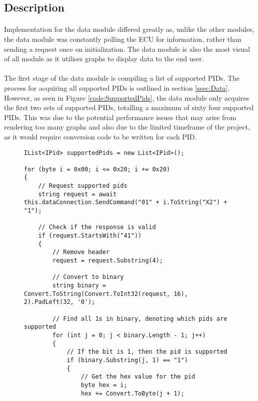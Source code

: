 	\subsection{Description}{		
		\paragraph{}{
		Implementation for the data module differed greatly as, unlike the other modules, the data module was constantly polling the ECU for information, rather than sending a request once on initialization. The data module is also the most visual of all module as it utilises graphs to display data to the end user.
		}
		
		\paragraph{}{
		The first stage of the data module is compiling a list of supported PIDs. The process for acquiring all supported PIDs is outlined in section \ref{ssec:Data}. However, as seen in Figure \ref{code:SupportedPids}, the data module only acquires the first two sets of supported PIDs, totalling a maximum of sixty four supported PIDs. This was due to the potential performance issues that may arise from rendering too many graphs and also due to the limited timeframe of the project, as it would require conversion code to be written for each PID.
		}
		
		\begin{figure}[h]
			\begin{lstlisting}
IList<IPid> supportedPids = new List<IPid>();

for (byte i = 0x00; i <= 0x20; i += 0x20)
{
	// Request supported pids
	string request = await this.dataConnection.SendCommand("01" + i.ToString("X2") + "1");

	// Check if the response is valid
	if (request.StartsWith("41"))
	{
		// Remove header
		request = request.Substring(4);

		// Convert to binary
		string binary = Convert.ToString(Convert.ToInt32(request, 16), 2).PadLeft(32, '0');

		// Find all 1s in binary, denoting which pids are supported
		for (int j = 0; j < binary.Length - 1; j++)
		{
			// If the bit is 1, then the pid is supported
			if (binary.Substring(j, 1) == "1")
			{
				// Get the hex value for the pid
				byte hex = i;
				hex += Convert.ToByte(j + 1);
								

\end{lstlisting}
\end{figure}}
